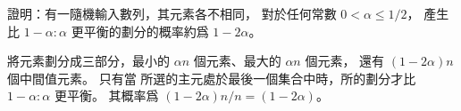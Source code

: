 證明：有一隨機輸入數列，其元素各不相同，
對於任何常數 $0<\alpha\le 1/2$，
  產生比 $1-\alpha : \alpha$ 更平衡的劃分的概率約爲 $1-2\alpha$。
\stopEXERCISE

\startANSWER
將元素劃分成三部分，最小的 $\alpha n$ 個元素、最大的 $\alpha n$ 個元素，
還有 $(1-2\alpha)n$ 個中間值元素。
只有當  所選的主元處於最後一個集合中時，所的劃分才比 $1-\alpha : \alpha$ 更平衡。
其概率爲 $(1-2\alpha)n / n = (1-2\alpha)$。
\stopANSWER

